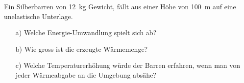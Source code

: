
\begin{aufgabe}
	Ein Silberbarren von \SI{12}{kg} Gewicht, fällt aus einer Höhe von \SI{100}{m} auf eine unelastische Unterlage.
	\begin{itemize}
		\item [a)] Welche Energie-Umwandlung spielt sich ab?
		\item [b)] Wie gross ist die erzeugte Wärmemenge?
		\item [c)] Welche Temperaturerhöhung würde der Barren erfahren, wenn man von jeder Wärmeabgabe an die Umgebung absähe?
	\end{itemize}
\end{aufgabe}

